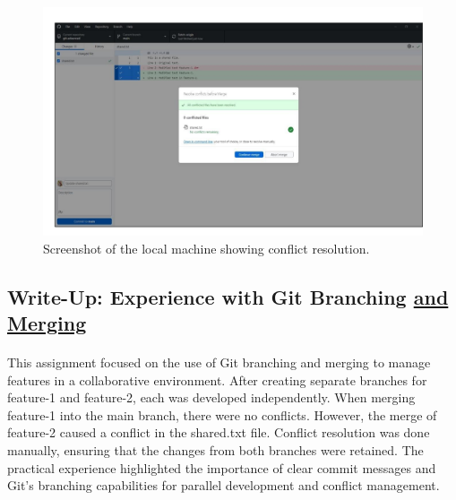\documentclass[a4paper,12pt]{article}
\begin{document}
\vspace{-2cm}
\begin{figure}[h!]
    \centering
    \includegraphics[width=0.8\linewidth]{conflict.png} %
    \hspace{4 cm}
    \caption{Screenshot of the local machine showing conflict resolution.}
\end{figure}

\subsection*{\LARGE{Write-Up: Experience with Git Branching {\underline{and Merging}}}}
\hspace{1 cm}
\paragraph{}
This assignment focused on the use of Git branching and merging to manage features in a collaborative environment. After creating separate branches for feature-1 and feature-2, each was developed independently.
When merging feature-1 into the main branch, there were no conflicts. However, the merge of feature-2 caused a conflict in the shared.txt file. Conflict resolution was done manually, ensuring that the changes from both branches were retained.
The practical experience highlighted the importance of clear commit messages and Git’s branching capabilities for parallel development and conflict management.
\end{document}

